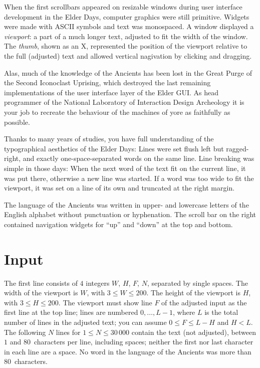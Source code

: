 

When the first scrollbars appeared on resizable windows during user interface development in the Elder Days, computer graphics were still primitive.
Widgets were made with ASCII symbols and text was monospaced.
A window displayed a \emph{viewport}: a part of a much longer text, adjusted to fit the width of the window.
The \emph{thumb}, shown as an X, represented the position of the viewport relative to the full (adjusted) text and allowed vertical nagivation by clicking and dragging.

Alas, much of the knowledge of the Ancients has been lost in the Great Purge of the Second Iconoclast Uprising, which destroyed the last remaining implementations of the user interface layer of the Elder GUI. 
As head programmer of the National Laboratory of Interaction Design Archeology it is your job to recreate the behaviour of the machines of yore as faithfully as possible.

Thanks to many years of studies, you have full understanding of the typographical aesthetics of the Elder Days:
Lines were set flush left but ragged-right, and exactly one-space-separated words on the same line. 
Line breaking was simple in those days:
When the next word of the text fit on the current line, it was put there, otherwise a new line was started.
If a word was too wide to fit the viewport, it was set on a line of its own and truncated at the right margin.

The language of the Ancients was written in upper- and lowercase letters of the English alphabet without punctuation or hyphenation.
The scroll bar on the right contained navigation widgets for ``up'' and ``down'' at the top and bottom. 

\section*{Input}

The first line consists of $4$ integers $W$, $H$, $F$, $N$, separated by single spaces.
The width of the viewport is $W$, with $3\leq W\leq 200$.
The height of the viewport is $H$, with $3\leq H\leq 200$.
The viewport must show line $F$ of the adjusted input as the first line at the top line; lines are numbered $0,\ldots, L-1$, where $L$ is the total number of lines in the adjusted text; you can assume $0\leq F \leq L - H$ and $H < L$.
The following $N$ lines for $1\leq N\leq 30\,000$ contain the text (not adjusted), between $1$ and $80$~characters per line, including spaces; neither the first nor last character in each line are a space.
No word in the language of the Ancients was more than $80$~characters.


